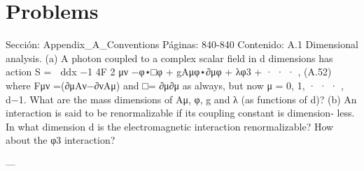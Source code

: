 \section*{Problems}
Sección: Appendix_A_Conventions
Páginas: 840-840
Contenido:
A.1 Dimensional analysis.
(a) A photon coupled to a complex scalar ﬁeld in d dimensions has action
S =

ddx
−1
4F 2
μν −φ⋆□φ + gAμφ⋆∂μφ + λφ3 + · · ·
,
(A.52)
where Fμν =(∂μAν−∂νAμ) and □= ∂μ∂μ as always, but now μ = 0, 1, · · · , d−1.
What are the mass dimensions of Aμ, φ, g and λ (as functions of d)?
(b) An interaction is said to be renormalizable if its coupling constant is dimension-
less. In what dimension d is the electromagnetic interaction renormalizable? How
about the φ3 interaction?


---

